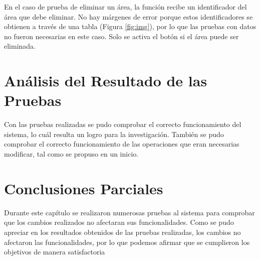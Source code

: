 En el caso de prueba de eliminar un área, la función recibe un identificador del área que debe eliminar. No hay márgenes de error porque estos identificadores se obtienen a través de una tabla (Figura \ref{fig:img}), por lo que las pruebas con datos no fueron necesarias en este caso. Solo se activa el botón si el área puede ser eliminada.

\section{Análisis del Resultado de las Pruebas}
Con las pruebas realizadas se pudo comprobar el correcto funcionamiento del sistema, lo cuál resulta un logro para la investigación. También se pudo comprobar el correcto funcionamiento de las operaciones que eran necesarias modificar, tal como se propuso en un inicio.

\section{Conclusiones Parciales}
Durante este capítulo se realizaron numerosas pruebas al sistema para comprobar que los cambios realizados no afectaran sus funcionalidades. Como se pudo apreciar en los resultados obtenidos de las pruebas realizadas, los cambios no afectaron las funcionalidades, por lo que podemos afirmar que se cumplieron los objetivos de manera satisfactoria